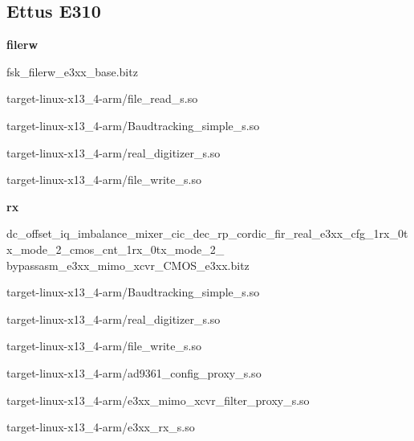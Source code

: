 \subsection{Ettus E310}
	\noindent\textbf{filerw}
	\begin{itemize}
	\begin{minipage}[t]{.5\textwidth}
	\item fsk\_filerw\_e3xx\_base.bitz

	\item target-linux-x13\_4-arm/file\_read\_s.so
	\item target-linux-x13\_4-arm/Baudtracking\_simple\_s.so
	\end{minipage}
	\begin{minipage}[t]{.5\textwidth}
	\item target-linux-x13\_4-arm/real\_digitizer\_s.so
	\item target-linux-x13\_4-arm/file\_write\_s.so
	\end{minipage}
	\end{itemize}

	\noindent\textbf{rx}
	\begin{itemize}
  \item dc\_offset\_iq\_imbalance\_mixer\_cic\_dec\_rp\_cordic\_fir\_real\_e3xx\_cfg\_1rx\_0tx\_mode\_2\_cmos\_cnt\_1rx\_0tx\_mode\_2\_ \\
	bypassasm\_e3xx\_mimo\_xcvr\_CMOS\_e3xx.bitz \\

	\begin{minipage}[t]{.5\textwidth}
	\item target-linux-x13\_4-arm/Baudtracking\_simple\_s.so
	\item target-linux-x13\_4-arm/real\_digitizer\_s.so
	\item target-linux-x13\_4-arm/file\_write\_s.so
	\end{minipage}
	\begin{minipage}[t]{.5\textwidth}
	\item target-linux-x13\_4-arm/ad9361\_config\_proxy\_s.so
	\item target-linux-x13\_4-arm/e3xx\_mimo\_xcvr\_filter\_proxy\_s.so
	\item target-linux-x13\_4-arm/e3xx\_rx\_s.so
	\end{minipage}
	\end{itemize}

